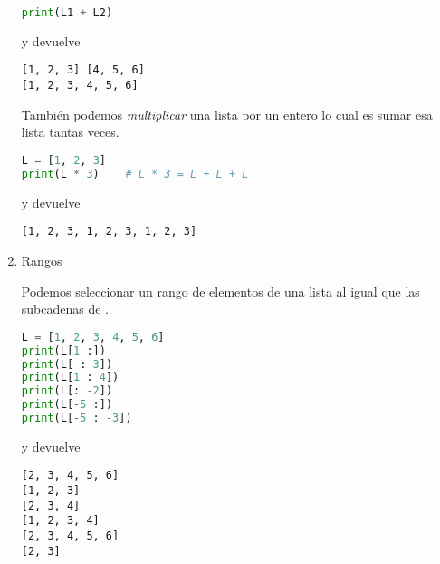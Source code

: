 \begin{enumerate}
\begin{lstlisting}[language={python}]
print(L1 + L2)
        \end{lstlisting}
        y devuelve
        \begin{lstlisting}[language={[latex]tex}]
[1, 2, 3] [4, 5, 6]
[1, 2, 3, 4, 5, 6]
        \end{lstlisting}
        También podemos \emph{multiplicar} una lista por un entero lo cual es sumar esa lista tantas veces.
        \begin{lstlisting}[language={python}]
L = [1, 2, 3]
print(L * 3)    # L * 3 = L + L + L
        \end{lstlisting}
        y devuelve
        \begin{lstlisting}[language={[latex]tex}]
[1, 2, 3, 1, 2, 3, 1, 2, 3]
        \end{lstlisting}
        \item Rangos\par 
        Podemos seleccionar un rango de elementos de una lista al igual que las subcadenas de .
        \begin{lstlisting}[language={python}]
L = [1, 2, 3, 4, 5, 6]
print(L[1 :])
print(L[ : 3])
print(L[1 : 4])
print(L[: -2])
print(L[-5 :])
print(L[-5 : -3])
        \end{lstlisting}
        y devuelve
        \begin{lstlisting}[language={[latex]tex}]
[2, 3, 4, 5, 6]
[1, 2, 3]
[2, 3, 4]
[1, 2, 3, 4]
[2, 3, 4, 5, 6]
[2, 3]
        \end{lstlisting}
    \end{enumerate}
